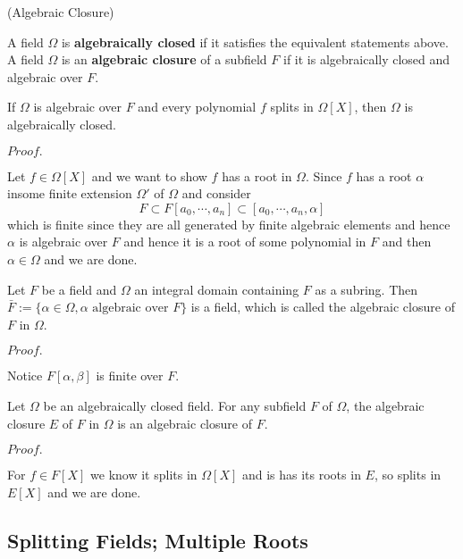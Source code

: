 \documentclass{article}
\newcommand{\Pf}[1]{$Proof.$\par}
\begin{document}
\begin{definition}
    (Algebraic Closure)\par
    A field $\Omega$ is \textbf{algebraically closed} if it satisfies the equivalent statements above. A field $\Omega$ is an \textbf{algebraic closure} of a subfield $F$ if it is algebraically closed and algebraic over $F$.
\end{definition}

\begin{proposition}
    If $\Omega$ is algebraic over $F$ and every polynomial $f$ splits in $\Omega[X]$, then $\Omega$ is algebraically closed.
\end{proposition}
\Pf\par
    Let $f\in \Omega[X]$ and we want to show $f$ has a root in $\Omega$. Since $f$ has a root $\alpha$ insome finite extension $\Omega'$ of $\Omega$ and consider
    \[F\subset F[a_0,\cdots,a_n]\subset[a_0,\cdots,a_n,\alpha]\]
    which is finite since they are all generated by finite algebraic elements and hence $\alpha$ is algebraic over $F$ and hence it is a root of some polynomial in $F$ and then $\alpha \in \Omega$ and we are done.

\begin{proposition}
    Let $F$ be a field and $\Omega$ an integral domain containing $F$ as a subring. Then $\bar{F}:= \{\alpha \in \Omega, \alpha\text{ algebraic over }F\}$ is a field, which is called the algebraic closure of $F$ in $\Omega$.
\end{proposition}
\Pf\par
    Notice $F[\alpha,\beta]$ is finite over $F$.

\begin{corollary}
    Let $\Omega$ be an algebraically closed field. For any subfield $F$ of $\Omega$, the algebraic closure $E$ of $F$ in $\Omega$ is an algebraic closure of $F$.
\end{corollary}
\Pf\par
    For $f\in F[X]$ we know it splits in $\Omega[X]$ and is has its roots in $E$, so splits in $E[X]$ and we are done.

\subsection{Splitting Fields; Multiple Roots}
\end{document}
